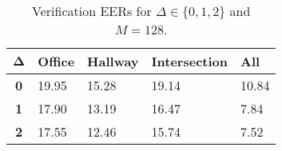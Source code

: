 \begin{table}[h]
    \centering
    \begin{tabular}{|c|M{2cm}|M{2cm}|M{2cm}|M{2cm}|}
    \hline
    $\boldsymbol{\Delta}$ & \bf{Office} & \bf{Hallway} & \bf{Intersection} & \bf{All} \\ 
    \hline 
    \hline
    \bf{0} & 19.95 & 15.28 & 19.14 & 10.84 \\
    \hline
    \bf{1} & 17.90 & 13.19 & 16.47 & 7.84 \\
    \hline
    \bf{2} & 17.55 & 12.46 & 15.74 & 7.52 \\
    \hline
    \end{tabular}
    \caption{Verification EERs for $\Delta \in \{0, 1, 2\}$ and $M = 128$.}
    \label{tab:verify_adapted_wm_M_128}
\end{table}
